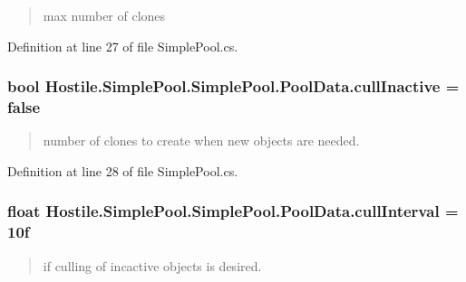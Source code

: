 \begin{quotation}
max number of clones \end{quotation}




Definition at line 27 of file Simple\-Pool.\-cs.

\hypertarget{class_hostile_1_1_simple_pool_1_1_simple_pool_1_1_pool_data_a060629295fb510de44ccd4e7ab0a41f1}{
\subsubsection[{cull\-Inactive}]{\setlength{\rightskip}{0pt plus 5cm}bool Hostile.\-Simple\-Pool.\-Simple\-Pool.\-Pool\-Data.\-cull\-Inactive = false}}\label{class_hostile_1_1_simple_pool_1_1_simple_pool_1_1_pool_data_a060629295fb510de44ccd4e7ab0a41f1}


\begin{quotation}
number of clones to create when new objects are needed. \end{quotation}




Definition at line 28 of file Simple\-Pool.\-cs.

\hypertarget{class_hostile_1_1_simple_pool_1_1_simple_pool_1_1_pool_data_a174300eacbde77efbf917eff6e209def}{
\subsubsection[{cull\-Interval}]{\setlength{\rightskip}{0pt plus 5cm}float Hostile.\-Simple\-Pool.\-Simple\-Pool.\-Pool\-Data.\-cull\-Interval = 10f}}\label{class_hostile_1_1_simple_pool_1_1_simple_pool_1_1_pool_data_a174300eacbde77efbf917eff6e209def}


\begin{quotation}
if culling of incactive objects is desired. \end{quotation}




